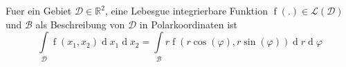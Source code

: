 Fuer ein Gebiet $\mathcal{D} \in \mathbb{R}^{2}$, eine Lebesgue integrierbare Funktion $\operatorname{f}(.) \in \mathcal{L}(\mathcal{D})$ und $\mathcal{B}$ als Beschreibung von $\mathcal{D}$ in Polarkoordinaten ist
$$\int\limits_{\mathcal{D}} \operatorname{f}(x_{1}, x_{2}) \operatorname{d} x_{1}  \operatorname{d} x_{2} = \int\limits_{\mathcal{B}} r \operatorname{f}(r \cos(\varphi), r \sin(\varphi)) \operatorname{d} r \operatorname{d} \varphi$$
